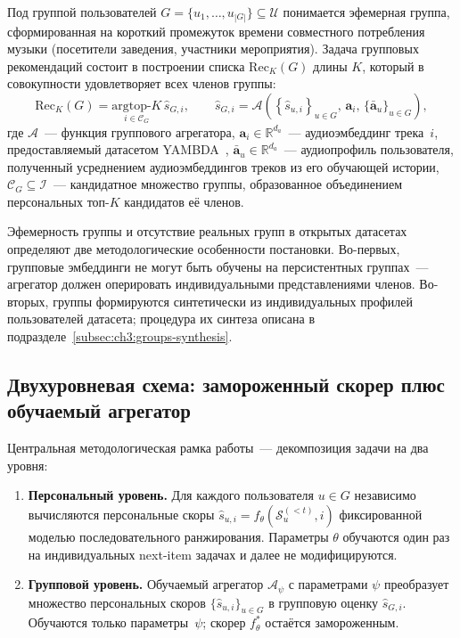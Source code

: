 Под группой пользователей $G = \{u_1, \ldots, u_{|G|}\} \subseteq \mathcal{U}$ понимается эфемерная группа, сформированная на короткий промежуток времени совместного потребления музыки (посетители заведения, участники мероприятия). Задача групповых рекомендаций состоит в построении списка $\mathrm{Rec}_K(G)$ длины $K$, который в совокупности удовлетворяет всех членов группы:
\begin{equation*}
    \mathrm{Rec}_K(G) = \underset{i \in \mathcal{C}_G}{\mathrm{argtop}\text{-}K}\, \hat{s}_{G, i},
    \qquad
    \hat{s}_{G, i} = \mathcal{A}\!\left( \left\{ \hat{s}_{u, i} \right\}_{u \in G}, \, \mathbf{a}_i, \, \{\bar{\mathbf{a}}_u\}_{u \in G} \right),
\end{equation*}
где $\mathcal{A}$~--- функция группового агрегатора, $\mathbf{a}_i \in \mathbb{R}^{d_a}$~--- аудиоэмбеддинг трека~$i$, предоставляемый датасетом YAMBDA~\cite{yambda2025}, $\bar{\mathbf{a}}_u \in \mathbb{R}^{d_a}$~--- аудиопрофиль пользователя, полученный усреднением аудиоэмбеддингов треков из его обучающей истории, $\mathcal{C}_G \subseteq \mathcal{I}$~--- кандидатное множество группы, образованное объединением персональных топ-$K$ кандидатов её членов.

Эфемерность группы и отсутствие реальных групп в открытых датасетах~\cite{cao2018agree, sankar2020groupim} определяют две методологические особенности постановки. Во-первых, групповые эмбеддинги не могут быть обучены на персистентных группах~--- агрегатор должен оперировать индивидуальными представлениями членов. Во-вторых, группы формируются синтетически из индивидуальных профилей пользователей датасета; процедура их синтеза описана в подразделе~\ref{subsec:ch3:groups-synthesis}.

\subsection{Двухуровневая схема: замороженный скорер плюс обучаемый агрегатор}\label{subsec:ch3:framework}

Центральная методологическая рамка работы~--- декомпозиция задачи на два уровня:

\begin{enumerate}
    \item \textbf{Персональный уровень.} Для каждого пользователя $u \in G$ независимо вычисляются персональные скоры $\hat{s}_{u, i} = f_\theta(\mathcal{S}_u^{(<t)}, i)$ фиксированной моделью последовательного ранжирования. Параметры $\theta$ обучаются один раз на индивидуальных next-item задачах и далее не модифицируются.
    \item \textbf{Групповой уровень.} Обучаемый агрегатор $\mathcal{A}_\psi$ с параметрами $\psi$ преобразует множество персональных скоров $\{\hat{s}_{u, i}\}_{u \in G}$ в групповую оценку $\hat{s}_{G, i}$. Обучаются только параметры~$\psi$; скорер $f_\theta^\ast$ остаётся замороженным.
\end{enumerate}

